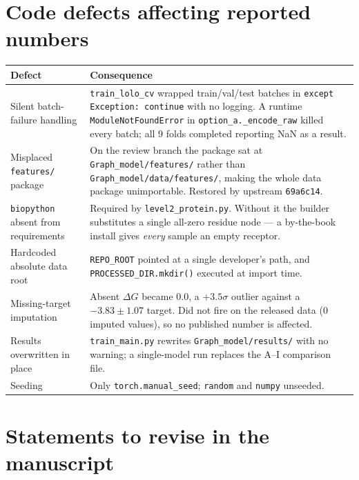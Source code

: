 \documentclass[11pt,a4paper]{article}
\newcommand{\bad}[1]{\textcolor{badred}{#1}}
\newcommand{\warn}[1]{\textcolor{warnamber}{#1}}
\newcommand{\code}[1]{\texttt{\small #1}}
\begin{document}
\section{Code defects affecting reported numbers}

\begin{longtable}{@{}p{5.2cm}p{9.8cm}@{}}
\toprule
\textbf{Defect} & \textbf{Consequence} \\
\midrule
\endhead
Silent batch-failure handling &
  \code{train\_lolo\_cv} wrapped train/val/test batches in
  \code{except Exception: continue} with no logging. A runtime
  \code{ModuleNotFoundError} in \code{option\_a.\_encode\_raw} killed
  every batch; all 9 folds completed reporting \bad{NaN} as a result. \\
Misplaced \code{features/} package &
  On the review branch the package sat at \code{Graph\_model/features/}
  rather than \code{Graph\_model/data/features/}, making the whole data
  package unimportable. Restored by upstream \code{69a6c14}. \\
\code{biopython} absent from requirements &
  Required by \code{level2\_protein.py}. Without it the builder
  substitutes a single all-zero residue node --- a by-the-book install
  gives \emph{every} sample an empty receptor. \\
Hardcoded absolute data root &
  \code{REPO\_ROOT} pointed at a single developer's path, and
  \code{PROCESSED\_DIR.mkdir()} executed at import time. \\
Missing-target imputation &
  Absent $\Delta G$ became $0.0$, a $+3.5\sigma$ outlier against a
  $-3.83 \pm 1.07$ target. \warn{Did not fire on the released data
  (0 imputed values), so no published number is affected.} \\
Results overwritten in place &
  \code{train\_main.py} rewrites \code{Graph\_model/results/} with no
  warning; a single-model run replaces the A--I comparison file. \\
Seeding &
  Only \code{torch.manual\_seed}; \code{random} and \code{numpy} unseeded. \\
\bottomrule
\end{longtable}

\section{Statements to revise in the manuscript}
\end{document}

